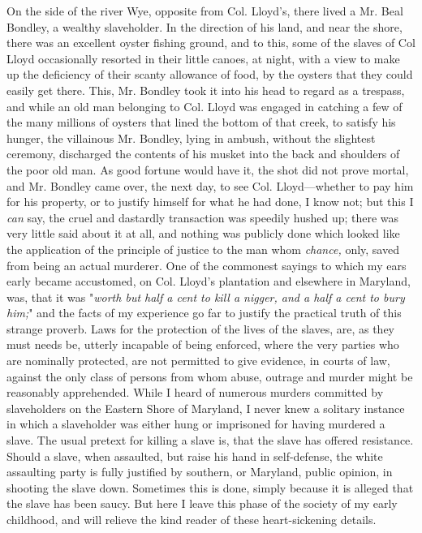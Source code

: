 On the side of the river Wye, opposite from Col. Lloyd's, there lived a
Mr. Beal Bondley, a wealthy slaveholder. In the direction of his land,
and near the shore, there was an excellent oyster fishing ground, and to
this, some of the slaves of Col Lloyd occasionally resorted in their
little canoes, at night, with a view to make up the deficiency of their
scanty allowance of food, by the oysters that they could easily get
there. This, Mr. Bondley took it into his head to regard as a trespass,
and while an old man belonging to Col. Lloyd was engaged in catching a
few of the many millions of oysters that lined the bottom of that creek,
to satisfy his hunger, the villainous Mr. Bondley, lying in ambush,
without the slightest ceremony, {}discharged the contents of his musket
into the back and shoulders of the poor old man. As good fortune would
have it, the shot did not prove mortal, and Mr. Bondley came over, the
next day, to see Col. Lloyd---whether to pay him for his property, or to
justify himself for what he had done, I know not; but this I \emph{can}
say, the cruel and dastardly transaction was speedily hushed up; there
was very little said about it at all, and nothing was publicly done
which looked like the application of the principle of justice to the man
whom \emph{chance,} only, saved from being an actual murderer. One of
the commonest sayings to which my ears early became accustomed, on Col.
Lloyd's plantation and elsewhere in Maryland, was, that it was
"\emph{worth but half a cent to kill a nigger, and a half a cent to bury
him;}" and the facts of my experience go far to justify the practical
truth of this strange proverb. Laws for the protection of the lives of
the slaves, are, as they must needs be, utterly incapable of being
enforced, where the very parties who are nominally protected, are not
permitted to give evidence, in courts of law, against the only class of
persons from whom abuse, outrage and murder might be reasonably
apprehended. While I heard of numerous murders committed by slaveholders
on the Eastern Shore of Maryland, I never knew a solitary instance in
which a slaveholder was either hung or imprisoned for having murdered a
slave. The usual pretext for killing a slave is, that the slave has
offered resistance. Should a slave, when assaulted, but raise his hand
in self-defense, the white assaulting party is fully justified by
southern, or Maryland, public opinion, in shooting the slave {}down.
Sometimes this is done, simply because it is alleged that the slave has
been saucy. But here I leave this phase of the society of my early
childhood, and will relieve the kind reader of these heart-sickening
details.
